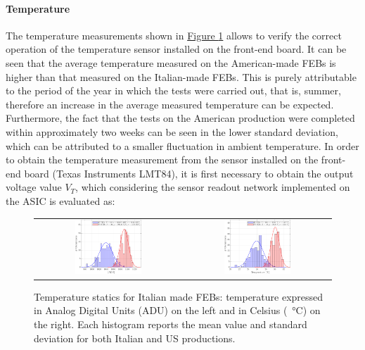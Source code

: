 \paragraph{Temperature} The temperature measurements shown in \hyperref[figFEBtemp]{Figure \ref{figFEBtemp}} allows to verify the correct operation of the temperature sensor installed on the front-end board. It can be seen that the average temperature measured on the American-made FEBs is higher than that measured on the Italian-made FEBs. This is purely attributable to the period of the year in which the tests were carried out, that is, summer, therefore an increase in the average measured temperature can be expected. Furthermore, the fact that the tests on the American production were completed within approximately two weeks can be seen in the lower standard deviation, which can be attributed to a smaller fluctuation in ambient temperature. In order to obtain the temperature measurement from the sensor installed on the front-end board (Texas Instruments LMT84), it is first necessary to obtain the output voltage value $V_{T}$, which considering the sensor readout network implemented on the ASIC is evaluated as:

\begin{figure}[h!]
    \centering
    \begin{tabular}{cc}
        \includegraphics[width=0.475\textwidth]{Images/chap2/results/temperatura_ADC.pdf} & \includegraphics[width=0.475\textwidth]{Images/chap2/results/temperatura_C.pdf}\\
    \end{tabular}
    \caption{Temperature statics for Italian made FEBs: temperature expressed in Analog Digital Units (ADU) on the left and in Celsius (\SI{}{\celsius}) on the right. Each histogram reports the mean value and standard deviation for both Italian and US productions.}
    \label{figFEBtemp}
\end{figure}

